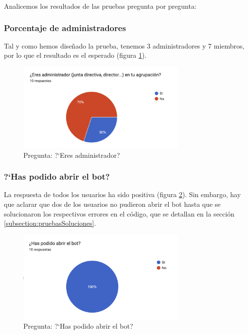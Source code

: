 Analicemos los resultados de las pruebas pregunta por pregunta:

\subsubsection{Porcentaje de administradores}

Tal y como hemos diseñado la prueba, tenemos 3 administradores y 7 miembros, por lo que el resultado es el esperado (figura \ref{fig:graficoAdministradores}).

\begin{figure}[h]
\centering
\includegraphics[width=0.75\textwidth]{imagenes/pruebas/eres_administrador.png}
\caption{Pregunta: ?`Eres administrador?}
\label{fig:graficoAdministradores}
\end{figure}

\subsubsection{?`Has podido abrir el bot?}

La respuesta de todos los usuarios ha sido positiva (figura \ref{fig:graficoAbrir}). Sin embargo, hay que aclarar que dos de los usuarios no pudieron abrir el bot hasta que se solucionaron los respectivos errores en el código, que se detallan en la sección \ref{subsection:pruebasSoluciones}.

\begin{figure}[h]
\centering
\includegraphics[width=0.75\textwidth]{imagenes/pruebas/has_podido_abrir.png}
\caption{Pregunta: ?`Has podido abrir el bot?}
\label{fig:graficoAbrir}
\end{figure}


